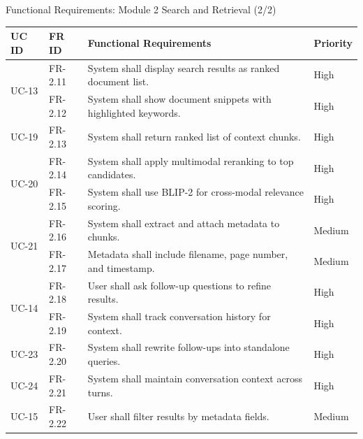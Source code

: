 \documentclass[aspectratio=169,xcolor=dvipsnames]{beamer}
\begin{document}
\begin{frame}{Functional Requirements: Module 2 Search and Retrieval (2/2)}
    \tiny
    \renewcommand{\arraystretch}{0.68}
    \begin{table}
        \centering
        \begin{tabular}{p{}|p{}|p{}|p{}}
        \toprule
        \textbf{UC ID} & \textbf{FR ID} & \textbf{Functional Requirements} & \textbf{Priority} \\
        \midrule
        \multirow{2}{*}{UC-13} & FR-2.11 & System shall display search results as ranked document list. & High \\
        & FR-2.12 & System shall show document snippets with highlighted keywords. & High \\
        \midrule
        UC-19 & FR-2.13 & System shall return ranked list of context chunks. & High \\
        \midrule
        \multirow{2}{*}{UC-20} & FR-2.14 & System shall apply multimodal reranking to top candidates. & High \\
        & FR-2.15 & System shall use BLIP-2 for cross-modal relevance scoring. & High \\
        \midrule
        \multirow{2}{*}{UC-21} & FR-2.16 & System shall extract and attach metadata to chunks. & Medium \\
        & FR-2.17 & Metadata shall include filename, page number, and timestamp. & Medium \\
        \midrule
        \multirow{2}{*}{UC-14} & FR-2.18 & User shall ask follow-up questions to refine results. & High \\
        & FR-2.19 & System shall track conversation history for context. & High \\
        \midrule
        UC-23 & FR-2.20 & System shall rewrite follow-ups into standalone queries. & High \\
        \midrule
        UC-24 & FR-2.21 & System shall maintain conversation context across turns. & High \\
        \midrule
        UC-15 & FR-2.22 & User shall filter results by metadata fields. & Medium \\
        \bottomrule
        \end{tabular}
    \end{table}
\end{frame}
\end{document}
